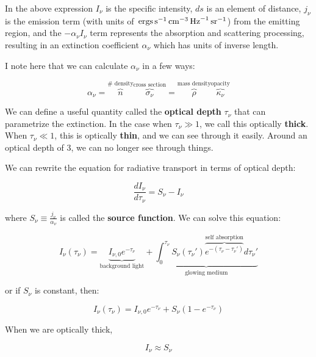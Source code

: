 \documentclass{article}
\newcommand{\unit}[1]{{\,\rm #1}}
\newcommand{\ergs}{\unit{ergs}}
\newcommand{\s}{\unit{s}}
\newcommand{\sr}{\unit{sr}}
\newcommand{\cm}{\unit{cm}}
\newcommand{\hz}{\unit{Hz}}
\begin{document}
In the above expression $I_\nu$ is the specific intensity, $ds$ is an element of distance, $j_\nu$ is the emission term (with units of $\ergs \s^{-1} \cm^{-3} \hz^{-1} \sr^{-1}$) from the emitting region, and the $-\alpha_\nu I_\nu$ term represents the absorption and scattering processing, resulting in an extinction coefficient $\alpha_\nu$ which has units of inverse length. 

I note here that we can calculate $\alpha_\nu$ in a few ways:

\begin{equation}
\boxed{\alpha_\nu=\overbrace{n}^{\text{\#\ density}}
\overbrace{\sigma_\nu}^{\text{cross\ section}}
=\overbrace{\rho}^{\text{mass\ density}}\overbrace{\kappa_\nu}^{\text{opacity}}}
\end{equation}

We can define a useful quantity called the \textbf{optical depth} $\tau_\nu$ that can parametrize the extinction. In the case when $\tau_\nu \gg 1$, we call this optically \textbf{thick}. When $\tau_\nu \ll 1$, this is optically \textbf{thin}, and we can see through it easily. Around an optical depth of $3$, we can no longer see through things. 

We can rewrite the equation for radiative transport in terms of optical depth: 

\begin{equation}
    \frac{d I_\nu}{d \tau_\nu} = S_\nu - I_\nu
\end{equation}

where $S_\nu \equiv \frac{j_\nu}{\alpha_\nu}$ is called the \textbf{source function}. We can solve this equation:

\begin{equation}
    \boxed{I_\nu \left(\tau_\nu\right) = \underbrace{I_{\nu,0} e^{-\tau_\nu}}_{\text{background light}} + \underbrace{\int_0^{\tau_\nu} S_\nu (\tau_\nu') \overbrace{e^{-\left(\tau_\nu - \tau_\nu'\right)}}^{\text{self absorption}} d \tau_\nu'}_{\text{glowing medium}}}
\end{equation}

or if $S_\nu$ is constant, then:

\begin{equation}
    \boxed{I_\nu (\tau_\nu) = I_{\nu,0} e^{-\tau_\nu} + S_\nu\left(1-e^{-\tau_\nu}\right)}
\end{equation}

When we are optically thick,

\begin{equation}
    I_\nu \approx S_\nu
\end{equation}
\end{document}
